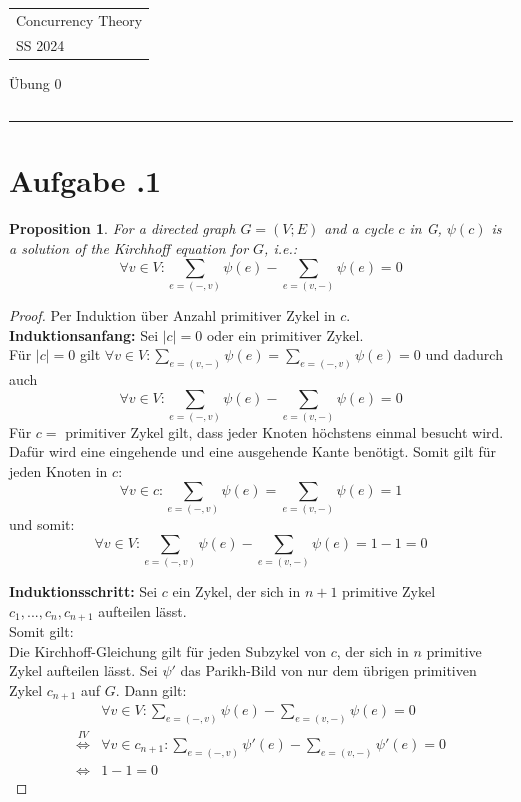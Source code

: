 \documentclass[a4paper,12pt]{article}
\newcounter{sheet}
\newcommand{\printsheet}{\arabic{sheet}}
\newcommand{\printmembers}{}
\newtheorem{proposition}{Proposition}[sheet]
\begin{document}
{\raggedright
\begin{tabular}{l}
    Concurrency Theory \\
    SS 2024 \\
\end{tabular}}
\hfill
{\Large Übung 0\printsheet}
\hfill
\begin{tabular}{l l}
\printmembers
\end{tabular}
\hrule



\section*{Aufgabe \printsheet.1}
\begin{proposition} For a directed graph $G=(V;E)$ and a cycle $c$ in G, $\psi(c)$ is a solution of the Kirchhoff equation for $G$, i.e.:
\[\forall v \in V: \sum_{e=(-,v)} \psi(e) - \sum_{e=(v,-)} \psi(e) = 0\] \end{proposition}
\begin{proof}
Per Induktion über Anzahl primitiver Zykel in $c$. \\
\textbf{Induktionsanfang:} Sei $|c| = 0$ oder ein primitiver Zykel. \\
Für $|c| = 0$ gilt $\forall v \in V: \sum_{e=(v,-)} \psi(e) = \sum_{e=(-,v)} \psi(e) = 0$ und dadurch auch 
\[\forall v \in V: \sum_{e=(-,v)} \psi(e) - \sum_{e=(v,-)} \psi(e) = 0\]
Für $c =$ primitiver Zykel gilt, dass jeder Knoten höchstens einmal besucht wird. Dafür wird eine eingehende und eine ausgehende Kante benötigt. Somit gilt für jeden Knoten in $c$:
\[\forall v \in c: \sum_{e=(-,v)} \psi(e) = \sum_{e=(v,-)} \psi(e) = 1\]
und somit:
\[\forall v \in V: \sum_{e=(-,v)} \psi(e) - \sum_{e=(v,-)} \psi(e) = 1-1 = 0\]

\textbf{Induktionsschritt:} Sei $c$ ein Zykel, der sich in $n+1$ primitive Zykel $c_1,...,c_n,c_{n+1}$ aufteilen lässt. \\
Somit gilt:\\
Die Kirchhoff-Gleichung gilt für jeden Subzykel von $c$, der sich in $n$ primitive Zykel aufteilen lässt. Sei $\psi'$ das Parikh-Bild von nur dem übrigen primitiven Zykel $c_{n+1}$ auf $G$. Dann gilt: \\
\begin{align*}
&\forall v \in V: \sum_{e=(-,v)} \psi(e) - \sum_{e=(v,-)} \psi(e) = 0\\
\overset{IV}{\Leftrightarrow}& \forall v \in c_{n+1}: \sum_{e=(-,v)} \psi'(e) - \sum_{e=(v,-)} \psi'(e) = 0 \\
\Leftrightarrow & 1 - 1 =  0
\end{align*}
\end{proof}
\end{document}
